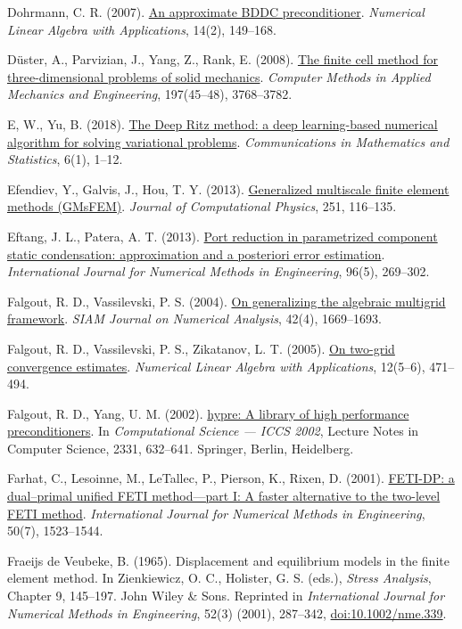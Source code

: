 \documentclass[preprint,12pt,authoryear]{elsarticle}
\begin{document}
Dohrmann, C. R. (2007). \href{https://doi.org/10.1002/nla.514}{An approximate BDDC preconditioner}. \emph{Numerical Linear Algebra with Applications}, 14(2), 149--168.

Düster, A., Parvizian, J., Yang, Z., Rank, E. (2008). \href{https://doi.org/10.1016/j.cma.2008.02.036}{The finite cell method for three-dimensional problems of solid mechanics}. \emph{Computer Methods in Applied Mechanics and Engineering}, 197(45--48), 3768--3782.

E, W., Yu, B. (2018). \href{https://doi.org/10.1007/s40304-018-0127-z}{The Deep Ritz method: a deep learning-based numerical algorithm for solving variational problems}. \emph{Communications in Mathematics and Statistics}, 6(1), 1--12.

Efendiev, Y., Galvis, J., Hou, T. Y. (2013). \href{https://doi.org/10.1016/j.jcp.2013.04.045}{Generalized multiscale finite element methods (GMsFEM)}. \emph{Journal of Computational Physics}, 251, 116--135.

Eftang, J. L., Patera, A. T. (2013). \href{https://doi.org/10.1002/nme.4543}{Port reduction in parametrized component static condensation: approximation and a posteriori error estimation}. \emph{International Journal for Numerical Methods in Engineering}, 96(5), 269--302.

Falgout, R. D., Vassilevski, P. S. (2004). \href{https://doi.org/10.1137/S0036142903429742}{On generalizing the algebraic multigrid framework}. \emph{SIAM Journal on Numerical Analysis}, 42(4), 1669--1693.

Falgout, R. D., Vassilevski, P. S., Zikatanov, L. T. (2005). \href{https://doi.org/10.1002/nla.437}{On two-grid convergence estimates}. \emph{Numerical Linear Algebra with Applications}, 12(5--6), 471--494.

Falgout, R. D., Yang, U. M. (2002). \href{https://doi.org/10.1007/3-540-47789-6_66}{hypre: A library of high performance preconditioners}. In \emph{Computational Science --- ICCS 2002}, Lecture Notes in Computer Science, 2331, 632--641. Springer, Berlin, Heidelberg.

Farhat, C., Lesoinne, M., LeTallec, P., Pierson, K., Rixen, D. (2001). \href{https://doi.org/10.1002/nme.76}{FETI-DP: a dual--primal unified FETI method---part I: A faster alternative to the two-level FETI method}. \emph{International Journal for Numerical Methods in Engineering}, 50(7), 1523--1544.

Fraeijs de Veubeke, B. (1965). Displacement and equilibrium models in the finite element method. In Zienkiewicz, O. C., Holister, G. S. (eds.), \emph{Stress Analysis}, Chapter 9, 145--197. John Wiley \& Sons. Reprinted in \emph{International Journal for Numerical Methods in Engineering}, 52(3) (2001), 287--342, \href{https://doi.org/10.1002/nme.339}{doi:10.1002/nme.339}.
\end{document}
